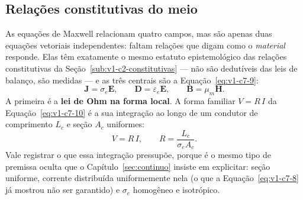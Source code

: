 \documentclass[12pt,a4paper]{article}
\numberwithin{equation}{section}
\numberwithin{table}{section}
\numberwithin{figure}{section}
\begin{document}
\begin{table}[H]
\centering
\caption[Validade da hipótese de parâmetros concentrados]{Hipótese de
parâmetros concentrados: critério de validade e modos de falha relevantes em
acionamento por inversor.}
\label{tab:v1-c7-1}
\small
{}
\end{table}

\subsection{Relações constitutivas do meio}\label{sub:v1-c7-constitutivas}

As equações de Maxwell relacionam quatro campos, mas são apenas duas equações
vetoriais independentes: faltam relações que digam como o \emph{material}
responde. Elas têm exatamente o mesmo estatuto epistemológico das relações
constitutivas da Seção~\ref{sub:v1-c2-constitutivas} --- não são dedutíveis das
leis de balanço, são medidas --- e as três centrais são a
Equação~\eqref{eq:v1-c7-9}:
\begin{equation}\label{eq:v1-c7-9}
\mathbf{J} = \sigma_e\mathbf{E},
\qquad
\mathbf{D} = \varepsilon_e\mathbf{E},
\qquad
\mathbf{B} = \mu_m\mathbf{H} .
\end{equation}
A primeira é a \textbf{lei de Ohm na forma local}. A forma familiar
$V = R\,I$ da Equação~\eqref{eq:v1-c7-10} é a sua integração ao longo de um
condutor de comprimento $L_c$ e seção $A_c$ uniformes:
\begin{equation}\label{eq:v1-c7-10}
V = R\,I,
\qquad
R = \frac{L_c}{\sigma_e A_c} .
\end{equation}
Vale registrar o que essa integração pressupõe, porque é o mesmo tipo de
premissa oculta que o Capítulo~\ref{sec:continuo} insiste em explicitar:
seção uniforme, corrente distribuída uniformemente nela (o que a
Equação~\eqref{eq:v1-c7-8} já mostrou não ser garantido) e $\sigma_e$
homogêneo e isotrópico.
\end{document}
